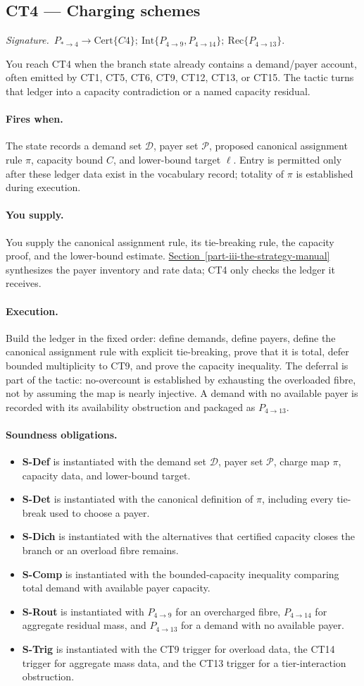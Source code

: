 \documentclass[
  11pt,
]{article}
\providecommand{\tightlist}{%
  \setlength{\itemsep}{0pt}\setlength{\parskip}{0pt}}
\theoremstyle{definition}
\newcommand{\secref}[1]{\hyperref[#1]{Section~\ref*{#1}}}
\newcommand{\ctsignature}[1]{\par\noindent\emph{Signature.}\ #1\par\medskip}
\newcommand{\ctcert}[1]{\mathrm{Cert}\{#1\}}
\newcommand{\ctint}[1]{\mathrm{Int}\{#1\}}
\newcommand{\ctrec}[1]{\mathrm{Rec}\{#1\}}
\newcommand{\ctpar}[1]{\paragraph{#1.}}
\begin{document}
\subsection{CT4 --- Charging schemes}\label{ct:4}\label{charging-schemes}
\ctsignature{\(P_{\ast\to4}\to \ctcert{C4};\ \ctint{P_{4\to9},P_{4\to14}};\ \ctrec{P_{4\to13}}\).}

You reach CT4 when the branch state already contains a demand/payer
account, often emitted by CT1, CT5, CT6, CT9, CT12, CT13, or CT15.  The
tactic turns that ledger into a capacity contradiction or a named
capacity residual.

\ctpar{Fires when}
The state records a demand set \(\mathcal D\), payer set \(\mathcal P\),
proposed canonical assignment rule \(\pi\), capacity bound \(C\), and
lower-bound target \(\ell\).  Entry is permitted only after these ledger
data exist in the vocabulary record; totality of \(\pi\) is established
during execution.

\ctpar{You supply}
You supply the canonical assignment rule, its tie-breaking rule, the capacity
proof, and the lower-bound estimate.  \secref{part-iii-the-strategy-manual} synthesizes the payer
inventory and rate data; CT4 only checks the ledger it receives.

\ctpar{Execution}
Build the ledger in the fixed order: define demands, define payers,
define the canonical assignment rule with explicit tie-breaking, prove
that it is total, defer bounded
multiplicity to CT9, and prove the capacity inequality.  The deferral is
part of the tactic: no-overcount is established by exhausting the
overloaded fibre, not by assuming the map is nearly injective.  A demand
with no available payer is recorded with its availability obstruction
and packaged as \(P_{4\to13}\).

\ctpar{Soundness obligations}
\begin{itemize}
\tightlist
\item \textbf{S-Def} is instantiated with the demand set \(\mathcal D\), payer set \(\mathcal P\), charge map \(\pi\), capacity data, and lower-bound target.
\item \textbf{S-Det} is instantiated with the canonical definition of \(\pi\), including every tie-break used to choose a payer.
\item \textbf{S-Dich} is instantiated with the alternatives that certified capacity closes the branch or an overload fibre remains.
\item \textbf{S-Comp} is instantiated with the bounded-capacity inequality comparing total demand with available payer capacity.
\item \textbf{S-Rout} is instantiated with \(P_{4\to9}\) for an overcharged fibre, \(P_{4\to14}\) for aggregate residual mass, and \(P_{4\to13}\) for a demand with no available payer.
\item \textbf{S-Trig} is instantiated with the CT9 trigger for overload data, the CT14 trigger for aggregate mass data, and the CT13 trigger for a tier-interaction obstruction.
\end{itemize}
\end{document}
